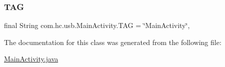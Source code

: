 \mbox{\label{classcom_1_1hc_1_1usb_1_1_main_activity_a6ac2d8bf5d6fdb9288c6aae6a05eec3a}} 
\subsubsection{\texorpdfstring{T\+AG}{TAG}}
{\footnotesize\ttfamily final String com.\+hc.\+usb.\+Main\+Activity.\+T\+AG = \char`\"{}Main\+Activity\char`\"{}\hspace{0.3cm}{\ttfamily [static]}, {\ttfamily [private]}}



The documentation for this class was generated from the following file\+:\begin{DoxyCompactItemize}
\item 
\mbox{\hyperlink{_main_activity_8java}{Main\+Activity.\+java}}\end{DoxyCompactItemize}
